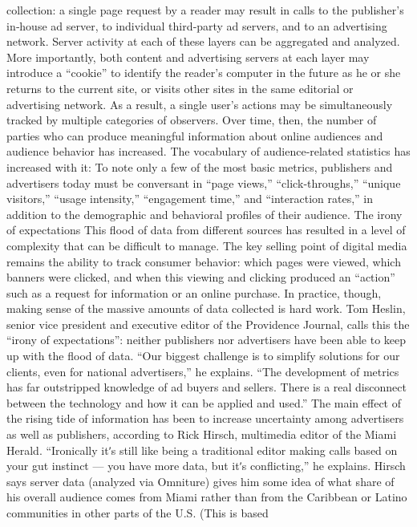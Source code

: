collection: a single page request by a reader may result in calls to the
publisher’s in‐house ad server, to individual third‐party ad servers, and to
an advertising network. Server activity at each of these layers can be
aggregated and analyzed. More importantly, both content and advertising
servers at each layer may introduce a ``cookie'' to identify the reader’s
computer in the future as he or she returns to the current site, or visits
other sites in the same editorial or advertising network. As a result, a
single user’s actions may be simultaneously tracked by multiple categories
of observers.
Over time, then, the number of parties who can produce meaningful
information about online audiences and audience behavior has increased.
The vocabulary of audience‐related statistics has increased with it: To note
only a few of the most basic metrics, publishers and advertisers today
must be conversant in ``page views,'' ``click‐throughs,'' ``unique visitors,''
``usage intensity,'' ``engagement time,'' and ``interaction rates,'' in addition
to the demographic and behavioral profiles of their audience.
The irony of expectations
This flood of data from different sources has resulted in a level of
complexity that can be difficult to manage. The key selling point of digital
media remains the ability to track consumer behavior: which pages were
viewed, which banners were clicked, and when this viewing and clicking
produced an ``action'' such as a request for information or an online
purchase. In practice, though, making sense of the massive amounts of
data collected is hard work.
Tom Heslin, senior vice president and executive editor of the Providence
Journal, calls this the ``irony of expectations'': neither publishers nor
advertisers have been able to keep up with the flood of data. ``Our biggest
challenge is to simplify solutions for our clients, even for national
advertisers,'' he explains. ``The development of metrics has far outstripped
knowledge of ad buyers and sellers. There is a real disconnect between the
technology and how it can be applied and used.''
The main effect of the rising tide of information has been to increase
uncertainty among advertisers as well as publishers, according to Rick
Hirsch, multimedia editor of the Miami Herald. ``Ironically itʹs still like
being a traditional editor making calls based on your gut instinct — you
have more data, but itʹs conflicting,'' he explains.
Hirsch says server data (analyzed via Omniture) gives him some idea of
what share of his overall audience comes from Miami rather than from the
Caribbean or Latino communities in other parts of the U.S. (This is based
